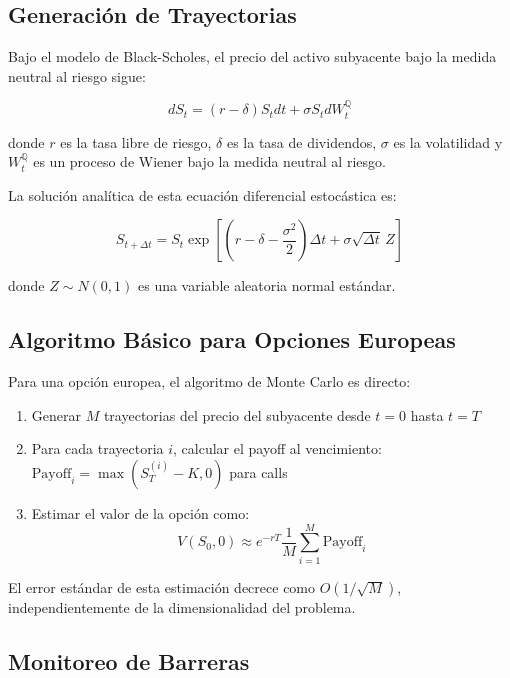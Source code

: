 \subsection{Generación de Trayectorias}

Bajo el modelo de Black-Scholes, el precio del activo subyacente bajo la medida neutral al riesgo sigue:

\begin{equation}
dS_t = (r - \delta)S_t dt + \sigma S_t dW_t^{\mathbb{Q}}
\end{equation}

donde $r$ es la tasa libre de riesgo, $\delta$ es la tasa de dividendos, $\sigma$ es la volatilidad y $W_t^{\mathbb{Q}}$ es un proceso de Wiener bajo la medida neutral al riesgo.

La solución analítica de esta ecuación diferencial estocástica es:

\begin{equation}
S_{t+\Delta t} = S_t \exp\left[\left(r - \delta - \frac{\sigma^2}{2}\right)\Delta t + \sigma\sqrt{\Delta t}\, Z\right]
\end{equation}

donde $Z \sim N(0,1)$ es una variable aleatoria normal estándar.

\subsection{Algoritmo Básico para Opciones Europeas}

Para una opción europea, el algoritmo de Monte Carlo es directo:

\begin{enumerate}
    \item Generar $M$ trayectorias del precio del subyacente desde $t=0$ hasta $t=T$
    \item Para cada trayectoria $i$, calcular el payoff al vencimiento: $\text{Payoff}_i = \max(S_T^{(i)} - K, 0)$ para calls
    \item Estimar el valor de la opción como:
    \begin{equation}
    V(S_0, 0) \approx e^{-rT} \frac{1}{M} \sum_{i=1}^{M} \text{Payoff}_i
    \end{equation}
\end{enumerate}

El error estándar de esta estimación decrece como $O(1/\sqrt{M})$, independientemente de la dimensionalidad del problema.

\subsection{Monitoreo de Barreras}

